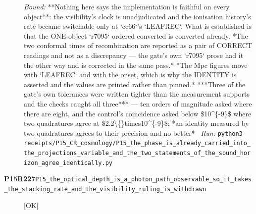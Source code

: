 \begin{description}
 \emph{Bound:}  **Nothing here says the implementation is faithful on every object**: the visibility's clock is unadjudicated and the ionisation history's rate became switchable only at `cc66`'s `LEAFREC`. What is established is that the ONE object `r7095` ordered converted is converted already.  *The two conformal times of recombination are reported as a pair of CORRECT readings and not as a discrepancy --- the gate's own `r7095` prose had it the other way and is corrected in the same pass.*  *The Mpc figures move with `LEAFREC` and with the onset, which is why the IDENTITY is asserted and the values are printed rather than pinned.*  ***Three of the gate's own tolerances were written tighter than the measurement supports and the checks caught all three*** --- ten orders of magnitude asked where there are eight, and the control's coincidence asked below \$10\textasciicircum{}\{-9\}\$ where two quadratures agree at \$2.2\textbackslash\{\}times10\textasciicircum{}\{-9\}\$; *an identity measured by two quadratures agrees to their precision and no better*
\ \emph{Run:} \texttt{python3 receipts/P15\_CR\_cosmology/P15\_the\_phase\_is\_already\_carried\_into\_the\_projections\_variable\_and\_the\_two\_statements\_of\_the\_sound\_horizon\_agree\_identically.py}
\item[\rcptlabel{P15_the_optical_depth_is_a_photon_path_observable_so_it_takes_the_stacking_rate_and_the_visibility_ruling_is_withdrawn}{P15R227}\textbf{P15R227}\quad\texttt{P15\_the\_optical\_depth\_is\_a\_photon\_path\_observable\_so\_it\_takes\_the\_stacking\_rate\_and\_the\_visibility\_ruling\_is\_withdrawn}]\hfill\textsf{[OK]}\\

\end{description}
